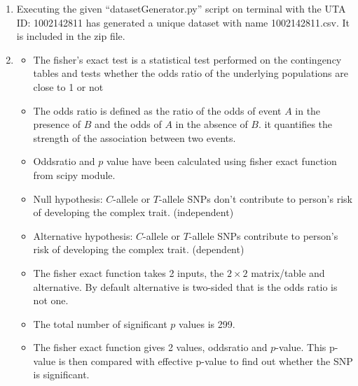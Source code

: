 \documentclass[12pt, oneside]{article}   	%
\begin{document}
\pagestyle{fancy}
\fancyhead{}

\begin{enumerate}
\item Executing the given “datasetGenerator.py” script on terminal with the UTA ID: 1002142811 has generated a unique dataset with name 1002142811.csv. It is included in the zip file.

\item 

\begin{itemize}
\item The fisher’s exact test is a statistical test performed on the contingency tables and tests whether the odds ratio of the underlying populations are close to 1 or not

\item The odds ratio is defined as the ratio of the odds of event $A$ in the presence of $B$ and the odds of $A$ in the absence of $B$. it quantifies the strength of the association between two events.

\item Oddsratio and $p$ value have been calculated using fisher exact function from scipy module.

\item Null hypothesis: $C$-allele or $T$-allele SNPs don’t contribute to person’s risk of developing the complex trait. (independent)

\item Alternative hypothesis: $C$-allele or $T$-allele SNPs contribute to person’s risk of developing the complex trait. (dependent)

\item The fisher exact function takes 2 inputs, the $2\times2$ matrix/table and alternative. By default alternative is two-sided that is the odds ratio is not one. 

\item The total number of significant $p$ values is 299.

\item The fisher exact function gives 2 values, oddsratio and $p$-value. This p-value is then compared with effective p-value to find out whether the SNP is significant.


\end{itemize}


\end{enumerate}
\end{document}
